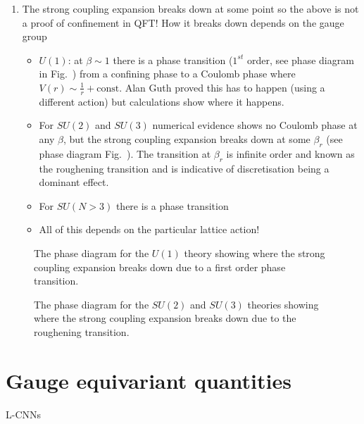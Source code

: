 \begin{itemize}
\begin{enumerate}
    \item The strong coupling expansion breaks down at some point so the above is not a proof of confinement in QFT! How it breaks down depends on the gauge group
    \begin{itemize}
        \item $U(1)$: at $\beta \sim 1$ there is a phase transition ($1^{st}$ order, see phase diagram in Fig.~) from a confining phase to a Coulomb phase where $V(r) \sim \frac{1}{r} + \text{const}$. Alan Guth proved this has to happen (using a different action) but calculations show where it happens.
        \item For $SU(2)$ and $SU(3)$ numerical evidence shows no Coulomb phase at any $\beta$, but the strong coupling expansion breaks down at some $\beta_r$ (see phase diagram Fig.~). The transition at $\beta_r$ is infinite order and known as the roughening transition and is indicative of discretisation being a dominant effect.
        \item For $SU(N>3)$ there is a phase transition
        \item All of this depends on the particular lattice action!
    \end{itemize}
\end{enumerate}
\begin{figure}
    \centering
    \caption{The phase diagram for the $U(1)$ theory showing where the strong coupling expansion breaks down due to a first order phase transition.
    \label{fig:strong_coupling_u1}}
\end{figure}
\begin{figure}
    \centering
    \caption{The phase diagram for the $SU(2)$ and $SU(3)$ theories showing where the strong coupling expansion breaks down due to the roughening transition.
    \label{fig:strong_coupling_su23}}
\end{figure}
\end{itemize}

\section{Gauge equivariant quantities}

L-CNNs


